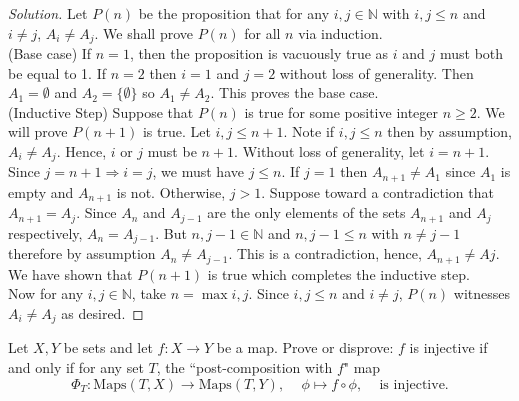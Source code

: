 \documentclass[12pt]{article}
\newenvironment{problem}[2][Problem]{\begin{trivlist}
\item[\hskip \labelsep {\bfseries #1}\hskip \labelsep {\bfseries #2.}]}{\end{trivlist}}
\begin{document}
\begin{proof}[Solution]
Let $P(n)$ be the proposition that for any $i, j \in \mathbb{N}$ with $i, j \leq n$ and $i \neq j$, $A_i \neq A_j$. We shall prove $P(n)$ for all $n$ via induction.
\\

(Base case) If $n = 1$, then the proposition is vacuously true as $i$ and $j$ must both be equal to 1. If $n = 2$ then $i = 1$ and $j = 2$ without loss of generality. Then $A_1 = \emptyset$ and $A_2 = \{\emptyset\}$ so $A_1 \neq A_2$. This proves the base case.
\\

(Inductive Step) Suppose that $P(n)$ is true for some positive integer $n \geq 2$. We will prove $P(n+1)$ is true. Let $i, j \leq n+1$. Note if $i,j \leq n$ then by assumption, $A_i \neq A_j$. Hence, $i$ or $j$ must be $n+1$. Without loss of generality, let $i = n + 1$. Since $j = n + 1 \Rightarrow i = j$, we must have $j \leq n$. If $j = 1$ then $A_{n+1} \neq A_1$ since $A_1$ is empty and $A_{n+1}$ is not. Otherwise, $j > 1$. Suppose toward a contradiction that $A_{n+1} =  A_{j}$. Since $A_{n}$ and $A_{j-1}$ are the only elements of the sets $A_{n+1}$ and $A_{j}$ respectively, $A_{n} = A_{j-1}$. But $n, j - 1 \in \mathbb{N}$ and $n, j - 1 \leq n$ with $n \neq j - 1$ therefore by assumption $A_n \neq A_{j - 1}$. This is a contradiction, hence, $A_{n+1} \neq A{j}$. We have shown that $P(n+1)$ is true which completes the inductive step.
\\

Now for any $i, j \in \mathbb{N}$, take $n = \max{i,j}$. Since $i,j \leq n$ and $i \neq j$, $P(n)$ witnesses $A_i \neq A_j$ as desired. 
\end{proof}

\newpage

\begin{problem}{4}[10 points]
Let $X, Y$ be sets and let $f : X \rightarrow Y$ be a map. Prove or disprove: $f$ is injective if and only if for any set $T$, the ``post-composition with $f$" map
\[\Phi_T : \text{Maps}(T, X) \longrightarrow \text{Maps}(T, Y) \text{, } \quad \phi \longmapsto f \circ \phi \text{, } \quad \text{is injective.}\]
\end{problem}
\end{document}
